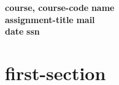 \documentclass[a4paper, 11pt]{article}
\begin{document}
\noindent
\large\textbf{course, course-code} \hfill \textbf{name} \\
\large\textbf{assignment-title} \hfill \textbf{mail} \\
\large\textbf{date} \hfill \textbf{ssn}

\section*{first-section}


\end{document}
